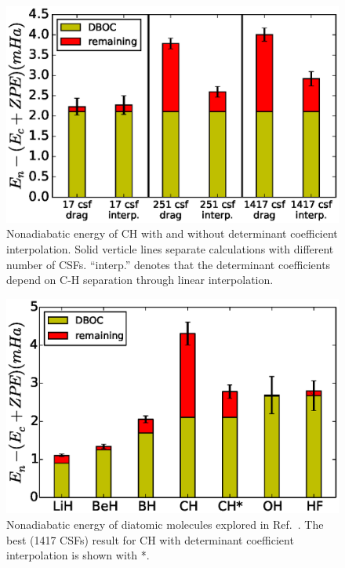 \documentclass[aip,jcp,numerical,reprint]{revtex4-1}
\begin{document}
\begin{figure}[h]
\includegraphics[scale=0.5]{ch-only}
\caption{Nonadiabatic energy of CH with and without determinant coefficient interpolation. Solid verticle lines separate calculations with different number of CSFs. ``interp.'' denotes that the determinant coefficients depend on C-H separation through linear interpolation. \label{fig:ch-interp} }
\end{figure}

\begin{figure}[h]
\includegraphics[scale=0.5]{4738}
\caption{Nonadiabatic energy of diatomic molecules explored in Ref.~\cite{Yang2015}. The best (1417 CSFs) result for CH with determinant coefficient interpolation is shown with *. }
\end{figure}
\end{document}
